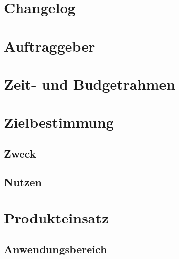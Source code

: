 \documentclass{article}
\gdef\contentsname{Inhaltsverzeichnis}
\gdef\listfigurename{Abbildungsverzeichnis}
\gdef\listtablename{Tabellenverzeichnis}
\begin{document}
\gdef\contentsname{Inhaltsverzeichnis}
\gdef\listfigurename{Abbildungsverzeichnis}
\gdef\listtablename{Tabellenverzeichnis}

    

    \gdef\contentsname{Inhaltsverzeichnis}
    \tableofcontents
    \clearpage

    \section*{Changelog}\label{sec:changelog}
    
    \clearpage

    \setcounter{page}{1}

    \section{Auftraggeber}\label{sec:auftraggeber}
        
    \clearpage

    \section{Zeit- und Budgetrahmen}\label{sec:zeitbudget}
        
    \clearpage

    \section{Zielbestimmung}\label{sec:bestimmung}
        \subsection{Zweck}
            
        \subsection{Nutzen}
            
    \clearpage

    \section{Produkteinsatz}\label{sec:einsatz}
        \subsection{Anwendungsbereich}
        
\end{document}
